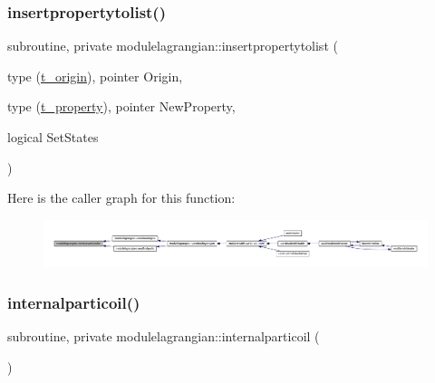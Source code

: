 \subsubsection{\texorpdfstring{insertpropertytolist()}{insertpropertytolist()}}
{\footnotesize\ttfamily subroutine, private modulelagrangian\+::insertpropertytolist (\begin{DoxyParamCaption}\item[{type (\mbox{\hyperlink{structmodulelagrangian_1_1t__origin}{t\+\_\+origin}}), pointer}]{Origin,  }\item[{type (\mbox{\hyperlink{structmodulelagrangian_1_1t__property}{t\+\_\+property}}), pointer}]{New\+Property,  }\item[{logical}]{Set\+States }\end{DoxyParamCaption})\hspace{0.3cm}{\ttfamily [private]}}

Here is the caller graph for this function\+:\nopagebreak
\begin{figure}[H]
\begin{center}
\leavevmode
\includegraphics[width=350pt]{namespacemodulelagrangian_ad3e2ea0ce974a102fea039aef69c4626_icgraph}
\end{center}
\end{figure}
\mbox{\label{namespacemodulelagrangian_a370ee1f0e073c2f783b4f91c7aee40f1}} 
\subsubsection{\texorpdfstring{internalparticoil()}{internalparticoil()}}
{\footnotesize\ttfamily subroutine, private modulelagrangian\+::internalparticoil (\begin{DoxyParamCaption}{ }\end{DoxyParamCaption})\hspace{0.3cm}{\ttfamily [private]}}

